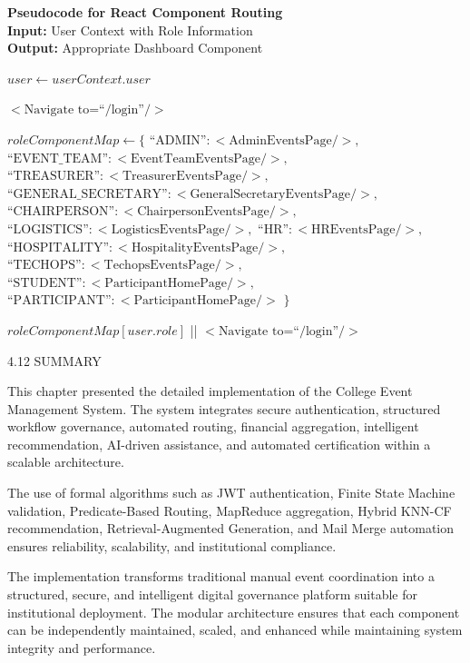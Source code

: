 \noindent\textbf{Pseudocode for React Component Routing} 
\vspace{.2em} \\
\noindent\textbf{Input:} User Context with Role Information\\
\noindent\textbf{Output:} Appropriate Dashboard Component
\begin{algorithmic}[1]
    \State $user \gets userContext.user$
    
        \State \Return $<\text{Navigate to=``/login''} />$
    \EndIf
    
    \State $roleComponentMap \gets \{$
    \State \hspace{1em} $\text{``ADMIN''}: <\text{AdminEventsPage} />,$
    \State \hspace{1em} $\text{``EVENT\_TEAM''}: <\text{EventTeamEventsPage} />,$
    \State \hspace{1em} $\text{``TREASURER''}: <\text{TreasurerEventsPage} />,$
    \State \hspace{1em} $\text{``GENERAL\_SECRETARY''}: <\text{GeneralSecretaryEventsPage} />,$
    \State \hspace{1em} $\text{``CHAIRPERSON''}: <\text{ChairpersonEventsPage} />,$
    \State \hspace{1em} $\text{``LOGISTICS''}: <\text{LogisticsEventsPage} />,$
    \State \hspace{1em} $\text{``HR''}: <\text{HREventsPage} />,$
    \State \hspace{1em} $\text{``HOSPITALITY''}: <\text{HospitalityEventsPage} />,$
    \State \hspace{1em} $\text{``TECHOPS''}: <\text{TechopsEventsPage} />,$
    \State \hspace{1em} $\text{``STUDENT''}: <\text{ParticipantHomePage} />,$
    \State \hspace{1em} $\text{``PARTICIPANT''}: <\text{ParticipantHomePage} />$
    \State $\}$
    
    \State \Return $roleComponentMap[user.role]$ || $<\text{Navigate to=``/login''} />$
\EndFunction
\end{algorithmic}

4.12 SUMMARY

This chapter presented the detailed implementation of the College Event Management System. The system integrates secure authentication, structured workflow governance, automated routing, financial aggregation, intelligent recommendation, AI-driven assistance, and automated certification within a scalable architecture.

The use of formal algorithms such as JWT authentication, Finite State Machine validation, Predicate-Based Routing, MapReduce aggregation, Hybrid KNN-CF recommendation, Retrieval-Augmented Generation, and Mail Merge automation ensures reliability, scalability, and institutional compliance.

The implementation transforms traditional manual event coordination into a structured, secure, and intelligent digital governance platform suitable for institutional deployment. The modular architecture ensures that each component can be independently maintained, scaled, and enhanced while maintaining system integrity and performance.